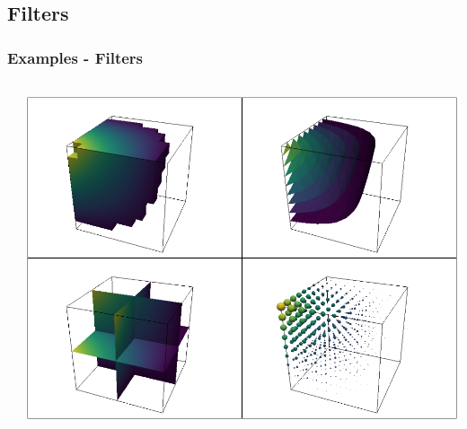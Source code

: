 \documentclass[t]{beamer}
\renewcommand{\footnotesize}{\scriptsize}
\begin{document}
\subsection{Filters}
\begin{frame}
    \frametitle{Examples - Filters}

    \begin{center}
        \begin{columns}[T]
            \begin{column}{.5\textwidth}
                \inputminted[fontsize=\footnotesize]{python}{code/filters.py}
            \end{column}

            \begin{column}{.5\textwidth}
                \centering
                \includegraphics[width=1.0\textwidth]{figures/filters_trans.png}
            \end{column}
        \end{columns}
    \end{center}

\end{frame}
\end{document}
